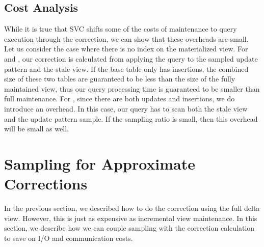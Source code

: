 \subsection{Cost Analysis}
While it is true that SVC shifts some of the costs of maintenance to query execution through the correction, we can show that these overheads are small.
Let us consider the case where there is no index on the materialized view. 
For \fjview and \spview, our correction is calculated from applying the query to the sampled update pattern and the stale view.
If the base table only has insertions, the combined size of these two tables are guaranteed to be less than the size
of the fully maintained view, thus our query processing time is guaranteed to be smaller than full maintenance.
For \aggview, since there are both updates and insertions, we do introduce an overhead. 
In this case, our query has to scan both the stale view and the update pattern sample.
If the sampling ratio is small, then this overhead will be small as well. 




\iffalse
\section{Sampling for Approximate Corrections}
In the previous section, we described how to do the correction using the full delta view.
However, this is just as expensive as incremental view maintenance.
In this section, we describe how we can couple sampling with the correction calculation to
save on I/O and communication costs. 


